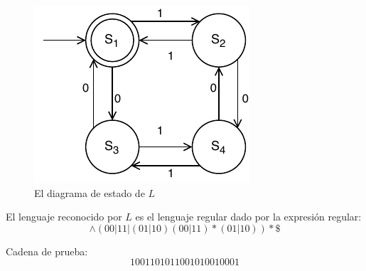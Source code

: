 \begin{figure}[H]
	\centering
	\includegraphics[width=0.4\linewidth]{doc/FiniteAutomaton/img/AFD}
	\caption{El diagrama de estado de $L$}
	\label{fig:AFD}
\end{figure}

El lenguaje reconocido por $L$ es el lenguaje regular dado por la expresión regular: 
$$
\wedge(00|11|(01|10)(00|11)*(01|10))*\$
$$

Cadena de prueba:
$$
1001101011001010010001
$$

